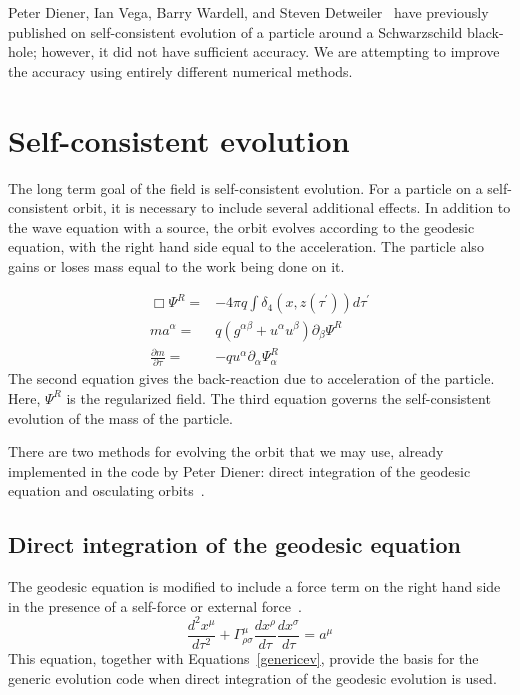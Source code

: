 Peter Diener, Ian Vega, Barry Wardell, and Steven Detweiler~\cite{diener_vega_wardell_detwieler_2012} have previously published on self-consistent evolution of a particle around a Schwarzschild black-hole; however, it did not have sufficient accuracy. We are attempting to improve the accuracy using entirely different numerical methods.

\section{Self-consistent evolution}



The long term goal of the field is self-consistent evolution. For a particle on a self-consistent orbit, it is necessary to include several additional effects. In addition to the wave equation with a source, the orbit evolves according to the geodesic equation, with the right hand side equal to the acceleration. The particle also gains or loses mass equal to the work being done on it. 

\begin{eqnarray}
  \Box\Psi^{R} =& -4\pi q \int\delta_4(x,z(\tau^\prime))d\tau^\prime\nonumber\\
    ma^\alpha=&q(g^{\alpha\beta}+u^\alpha u^\beta)\partial_\beta\Psi^{R}\nonumber\\
    \frac{\partial m}{\partial \tau}=&-q u^\alpha\partial_\alpha \Psi^R_\alpha
    \label{genericev}
\end{eqnarray}
The second equation gives the back-reaction due to acceleration of the particle. Here, $\Psi^R$ is the regularized field. The third equation governs the self-consistent evolution of the mass of the particle.~\cite{WardellSelfForceReview}

There are two methods for evolving the orbit that we may use, already implemented in the code by Peter Diener: direct integration of the geodesic equation and osculating orbits~\cite{pound_poisson}.

\subsection{Direct integration of the geodesic equation}
The geodesic equation is modified to include a force term on the right hand side in the presence of a self-force or external force~\cite{Carroll}.
\begin{equation}
  \frac{d^2x^\mu}{d\tau^2}+\Gamma^\mu_{\rho\sigma}\frac{dx^\rho}{d\tau}\frac{dx^\sigma}{d\tau}=a^\mu
\end{equation}
This equation, together with Equations~\ref{genericev}, provide the basis for the generic evolution code when direct integration of the geodesic evolution is used. 

